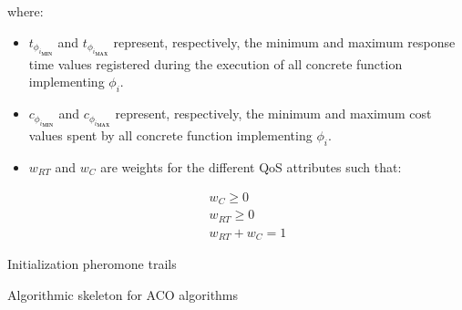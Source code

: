 \documentclass[10pt,a4paper]{report}
\theoremstyle{definition}
\begin{document}
where:

\begin{itemize}
	\item $t_{\phi_{i_{\textbf{MIN}}}}$ and $t_{\phi_{i_{\textbf{MAX}}}}$ represent, respectively, the minimum and maximum response time values registered during the execution of all concrete function implementing $\phi_i$.
	
	\item $c_{\phi_{i_{\textbf{MIN}}}}$ and $c_{\phi_{i_{\textbf{MAX}}}}$ represent, respectively, the minimum and maximum cost values spent by all concrete function implementing $\phi_i$.
	
	\item $w_{RT}$ and $w_{C}$ are weights for the different QoS attributes such that:
	
	\begin{eqnarray}
		w_{C} \geq 0 \\
		w_{RT} \geq 0 \\
		w_{RT} + w_{C} = 1
	\end{eqnarray}
	
\end{itemize}




\begin{algorithm}
	Initialization pheromone trails\;
	\caption{Algorithmic skeleton for ACO algorithms}
\end{algorithm}


\begin{algorithm}
\end{algorithm}
\end{document}
